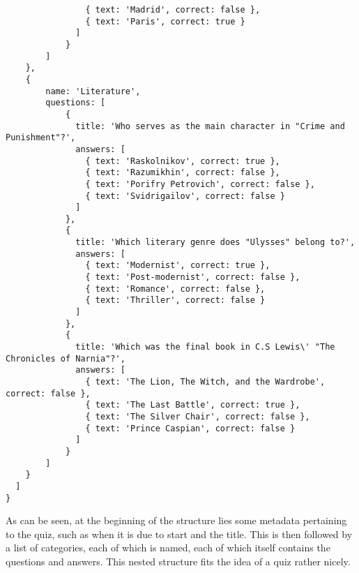 \begin{verbatim}
  			    { text: 'Madrid', correct: false },
  			    { text: 'Paris', correct: true }
  			  ]
  			}
  		]
  	},
  	{
  		name: 'Literature',
  		questions: [
  			{
  			  title: 'Who serves as the main character in "Crime and Punishment"?',
  			  answers: [
  			    { text: 'Raskolnikov', correct: true },
  			    { text: 'Razumikhin', correct: false },
  			    { text: 'Porifry Petrovich', correct: false },
  			    { text: 'Svidrigailov', correct: false }
  			  ]
  			},
  			{
  			  title: 'Which literary genre does "Ulysses" belong to?',
  			  answers: [
  			    { text: 'Modernist', correct: true },
  			    { text: 'Post-modernist', correct: false },
  			    { text: 'Romance', correct: false },
  			    { text: 'Thriller', correct: false }
  			  ]
  			},
  			{
  			  title: 'Which was the final book in C.S Lewis\' "The Chronicles of Narnia"?',
  			  answers: [
  			    { text: 'The Lion, The Witch, and the Wardrobe', correct: false },
  			    { text: 'The Last Battle', correct: true },
  			    { text: 'The Silver Chair', correct: false },
  			    { text: 'Prince Caspian', correct: false }
  			  ]
  			}
  		]
  	}
  ]
}
\end{verbatim}

As can be seen, at the beginning of the structure lies some metadata pertaining to the quiz, such as when it is due to start and the title. This is then followed by a list of categories, each of which is named, each of which itself contains the questions and answers. This nested structure fits the idea of a quiz rather nicely.
